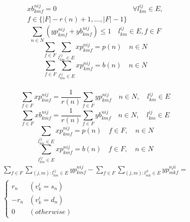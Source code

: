 \documentclass[a4j,twocolumn,fleqn]{jarticle}
\begin{document}
\begin{eqnarray}%
xb^{nij}_{kmf} = 0 & \forall l^{ij}_{km} \in E, \\
f \in \{|F| - r(n)+1, \dots ,|F|-1\}\nonumber
\end{eqnarray}%
\begin{equation}%
\sum_{n \in N} (yp^{nij}_{kmf} + yb^{nij}_{kmf}) \leq 1 \quad l^{ij}_{km} \in E, f \in F
\end{equation}%
\begin{equation}
\sum_{f \in F}\sum_{l^{ij}_{km}\in E}xp^{nij}_{kmf} = p(n)\quad n \in N
\end{equation}
\begin{equation}
\sum_{f \in F}\sum_{l^{ij}_{km}\in E}xp^{nij}_{kmf} = b(n)\quad n \in N
\end{equation}
\\
\begin{equation}
\sum_{f \in F}xp^{nij}_{kmf} = \frac{1}{r(n)}\sum_{f\in F}yp^{nij}_{kmf}\quad n \in N,\quad l^{ij}_{km} \in E
\end{equation}
\begin{equation}
\sum_{f \in F}xb^{nij}_{kmf} = \frac{1}{r(n)}\sum_{f\in F}yb^{nij}_{kmf}\quad n \in N,\quad l^{ij}_{km} \in E
\end{equation}
\begin{equation}
\sum_{l^{ij}_{km}\in E}xp^{nij}_{kmf} = p(n)\quad f \in F,\quad n \in N
\end{equation}
\begin{equation}
\sum_{l^{ij}_{km}\in E}xp^{nij}_{kmf} = b(n)\quad f \in F,\quad n \in N
\end{equation}
\begin{eqnarray}%
\sum_{f \in F}\sum_{(j,m):l^{ij}_{km}\in E}yp^{nij}_{kmf} - \sum_{f \in F}\sum_{(j,m):l^{ji}_{mk}\in E}yp^{nji}_{mkf}= \nonumber \\
\begin{cases}
r_n & (v^i_k = s_n)\\
-r_n & (v^i_k =d_n)\\
0 & (otherwise)
\end{cases}
\end{eqnarray}%
\end{document}
